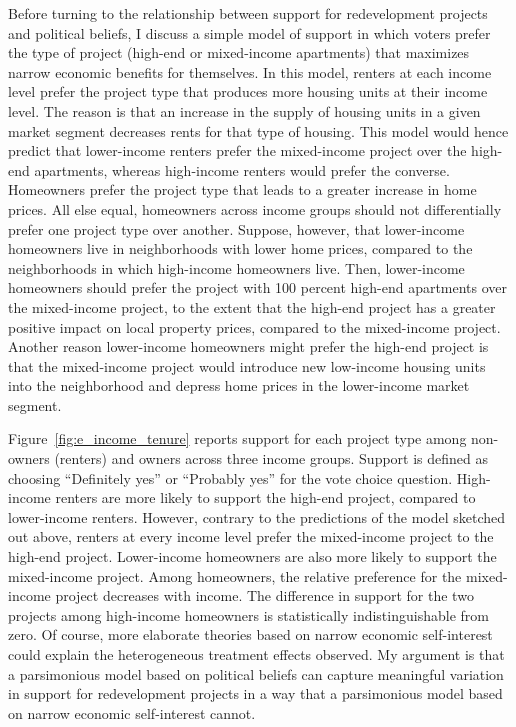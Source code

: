 \documentclass[article,11pt]{memoir}
\begin{document}
Before turning to the relationship between support for redevelopment projects and political beliefs, I discuss a simple model of support in which voters prefer the type of project (high-end or mixed-income apartments) that maximizes narrow economic benefits for themselves.  In this model, renters at each income level prefer the project type that produces more housing units at their income level.  The reason is that an increase in the supply of housing units in a given market segment decreases rents for that type of housing.  This model would hence predict that lower-income renters prefer the mixed-income project over the high-end apartments, whereas high-income renters would prefer the converse.  Homeowners prefer the project type that leads to a greater increase in home prices.  All else equal, homeowners across income groups should not differentially prefer one project type over another.  Suppose, however, that lower-income homeowners live in neighborhoods with lower home prices, compared to the neighborhoods in which high-income homeowners live. Then, lower-income homeowners should prefer the project with 100 percent high-end apartments over the mixed-income project, to the extent that the high-end project has a greater positive impact on local property prices, compared to the mixed-income project.  Another reason lower-income homeowners might prefer the high-end project is that the mixed-income project would introduce new low-income housing units into the neighborhood and depress home prices in the lower-income market segment.

Figure~\ref{fig:e_income_tenure} reports support for each project type among non-owners (renters) and owners across three income groups.  Support is defined as choosing ``Definitely yes'' or ``Probably yes'' for the vote choice question.  High-income renters are more likely to support the high-end project, compared to lower-income renters.  However, contrary to the predictions of the model sketched out above, renters at every income level prefer the mixed-income project to the high-end project.  Lower-income homeowners are also more likely to support the mixed-income project.  Among homeowners, the relative preference for the mixed-income project decreases with income.  The difference in support for the two projects among high-income homeowners is statistically indistinguishable from zero.  Of course, more elaborate theories based on narrow economic self-interest could explain the heterogeneous treatment effects observed. My argument is that a parsimonious model based on political beliefs can capture meaningful variation in support for redevelopment projects in a way that a parsimonious model based on narrow economic self-interest cannot.
\end{document}
